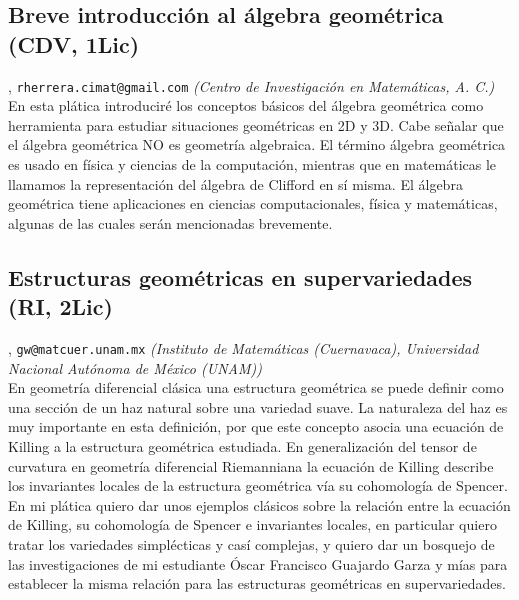\subsection{\sffamily Breve introducci\'on al \'algebra geom\'etrica {\footnotesize (CDV, 1Lic)}} \label{reg-379} 
, {\tt rherrera.cimat@gmail.com}  {\slshape (Centro de Investigaci\'on en Matem\'aticas, A. C.)}\\
          \noindent En esta pl\'atica introducir\'e los conceptos b\'asicos del \'algebra geom\'etrica como herramienta para estudiar situaciones geom\'etricas en 2D y 3D. Cabe se\~nalar que el \'algebra geom\'etrica NO es geometr\'ia algebraica. El t\'ermino \'algebra geom\'etrica es usado en f\'isica y ciencias de la computaci\'on, mientras que en matem\'aticas le llamamos la representaci\'on del \'algebra de Clifford en s\'i misma. El \'algebra geom\'etrica tiene aplicaciones en ciencias computacionales, f\'isica y matem\'aticas, algunas de las cuales ser\'an mencionadas brevemente.
\subsection{\sffamily Estructuras geom\'etricas en supervariedades {\footnotesize (RI, 2Lic)}} \label{reh-840} 
, {\tt gw@matcuer.unam.mx}  {\slshape (Instituto de Matem\'aticas (Cuernavaca), Universidad Nacional Aut\'onoma de M\'exico (UNAM))}\\
          \noindent En geometr\'ia diferencial cl\'asica una estructura geom\'etrica se puede definir como una secci\'on de un haz natural sobre una variedad suave. La naturaleza del haz es muy importante en esta definici\'on, por que este concepto asocia una ecuaci\'on de Killing a la estructura geom\'etrica estudiada. En generalizaci\'on del tensor de curvatura en geometr\'ia diferencial Riemanniana la ecuaci\'on de Killing describe los invariantes locales de la estructura geom\'etrica v\'ia su cohomolog\'ia de Spencer. En mi pl\'atica quiero dar unos ejemplos cl\'asicos sobre la relaci\'on entre la ecuaci\'on de Killing, su cohomolog\'ia de Spencer e invariantes locales, en particular quiero tratar los variedades simpl\'ecticas y cas\'i complejas, y quiero dar un bosquejo de las investigaciones de mi estudiante \'Oscar Francisco Guajardo Garza y m\'ias para establecer la misma relaci\'on para las estructuras geom\'etricas en supervariedades.

